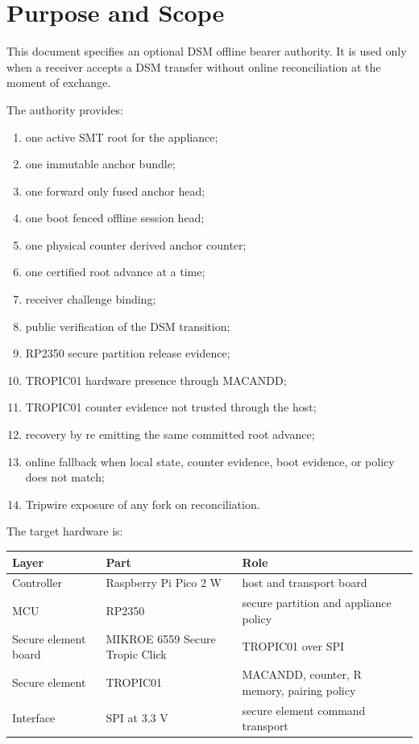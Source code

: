 \documentclass[11pt]{article}
\theoremstyle{definition}
\theoremstyle{remark}
\begin{document}
\section{Purpose and Scope}

This document specifies an optional DSM offline bearer authority. It is used only when a receiver
accepts a DSM transfer without online reconciliation at the moment of exchange.

The authority provides:

\begin{enumerate}[label=(\arabic*),leftmargin=2em]
\item one active SMT root for the appliance;
\item one immutable anchor bundle;
\item one forward only fused anchor head;
\item one boot fenced offline session head;
\item one physical counter derived anchor counter;
\item one certified root advance at a time;
\item receiver challenge binding;
\item public verification of the DSM transition;
\item RP2350 secure partition release evidence;
\item TROPIC01 hardware presence through MACANDD;
\item TROPIC01 counter evidence not trusted through the host;
\item recovery by re emitting the same committed root advance;
\item online fallback when local state, counter evidence, boot evidence, or policy does not match;
\item Tripwire exposure of any fork on reconciliation.
\end{enumerate}

The target hardware is:

\begin{center}
\begin{tabular}{lll}
\toprule
\textbf{Layer} & \textbf{Part} & \textbf{Role}\\
\midrule
Controller & Raspberry Pi Pico 2 W & host and transport board\\
MCU & RP2350 & secure partition and appliance policy\\
Secure element board & MIKROE 6559 Secure Tropic Click & TROPIC01 over SPI\\
Secure element & TROPIC01 & MACANDD, counter, R memory, pairing policy\\
Interface & SPI at 3.3 V & secure element command transport\\
\bottomrule
\end{tabular}
\end{center}
\end{document}
